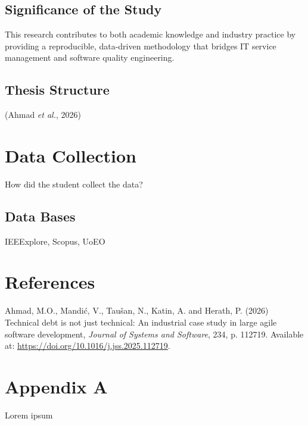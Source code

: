 \documentclass[
  11pt,
  letterpaper,
  11pt,
  oneside,
  english,
  onehalfspacing,
  headsepline]{MastersDoctoralThesis}
\newlength{\cslhangindent}
\newenvironment{CSLReferences}[2] %
 {\begin{list}{}{%
  \setlength{\itemindent}{0pt}
  \setlength{\leftmargin}{0pt}
  \setlength{\parsep}{0pt}
  \ifodd #1
   \setlength{\leftmargin}{\cslhangindent}
   \setlength{\itemindent}{-1\cslhangindent}
  \fi
  \setlength{\itemsep}{#2\baselineskip}}}
 {\end{list}}
\begin{document}
\section{Significance of the Study}\label{significance-of-the-study}

This research contributes to both academic knowledge and industry
practice by providing a reproducible, data-driven methodology that
bridges IT service management and software quality engineering.

\section{Thesis Structure}\label{thesis-structure}

(Ahmad \emph{et al.}, 2026)


\chapter{Data Collection}\label{data-collection}

How did the student collect the data?

\section{Data Bases}\label{data-bases}

IEEExplore, Scopus, UoEO


\chapter*{References}\label{references}


\label{refs}
\begin{CSLReferences}{0}{1}
Ahmad, M.O., Mandić, V., Taušan, N., Katin, A. and Herath, P. (2026)
\textquotesingle Technical debt is not just technical: {An} industrial
case study in large agile software development\textquotesingle,
\emph{Journal of Systems and Software}, 234, p. 112719. Available at:
\url{https://doi.org/10.1016/j.jss.2025.112719}.

\end{CSLReferences}

\cleardoublepage
{}
{}
\appendix

\chapter{Appendix A}\label{appendix-a}

Lorem ipsum
\end{document}
